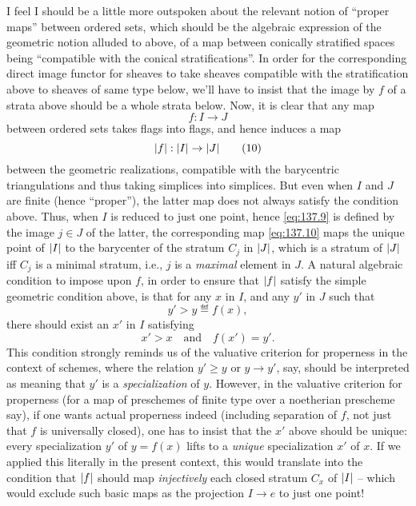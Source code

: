 I feel I should be a little more outspoken about the relevant notion
of ``proper maps'' between ordered sets, which should be the algebraic
expression of the geometric notion alluded to above, of a map between
conically stratified spaces being ``compatible with the conical
stratifications''. In order for the corresponding direct image functor
for sheaves to take sheaves compatible with the stratification above
to sheaves of same type below, we'll have to insist that the image by
$f$ of a strata above should be a whole strata below. Now, it is clear
that any map
\begin{equation}
  \label{eq:137.9}
  f:I\to J\tag{9}
\end{equation}
between ordered sets takes flags into flags, and hence induces a map
\begin{equation}
  \label{eq:137.10}
  \lvert f\rvert:\lvert I\rvert \to \lvert J\rvert\tag{10}
\end{equation}
between the geometric realizations, compatible with the barycentric
triangulations and thus taking simplices into simplices. But even when
$I$ and $J$ are finite (hence ``proper''), the latter map does not
always satisfy the condition above. Thus, when $I$ is reduced to just
one point, hence \eqref{eq:137.9} is defined by the image $j\in J$ of
the latter, the corresponding map \eqref{eq:137.10} maps the unique
point of $\lvert I\rvert$ to the barycenter of the stratum $C_j$ in $\lvert J\rvert$,
which is a stratum of $\lvert J\rvert$ if{f} $C_j$ is a minimal stratum, i.e.,
$j$ is a \emph{maximal} element in $J$. A natural algebraic condition
to impose upon $f$, in order to ensure that $\lvert f\rvert$ satisfy the
simple geometric condition above, is that for any $x$ in $I$, and any
$y'$ in $J$ such that
\[y'>y \eqdef f(x),\]
there should exist an $x'$ in $I$ satisfying
\begin{equation}
  \label{eq:137.11}
  x'>x \quad\text{and}\quad f(x')=y'.\tag{11}
\end{equation}
This condition strongly reminds us of the valuative criterion for
properness in the context of schemes, where the relation $y'\ge y$ or
$y\to y'$, say, should be interpreted as meaning that $y'$ is a
\emph{specialization} of $y$. However, in the valuative criterion for
properness (for a map of preschemes of finite type over a noetherian
prescheme say), if one wants actual properness indeed
(including separation of $f$, not just that $f$ is universally
closed), one has to insist that the $x'$ above should be unique: every
specialization $y'$ of $y=f(x)$ lifts to a \emph{unique}
specialization $x'$ of $x$. If we applied this literally in the
present context, this would translate into the condition that $\lvert f\rvert$
should map \emph{injectively} each closed stratum $C_x$ of $\lvert I\rvert$ --
which would exclude such basic maps as the projection $I\to e$ to just
one point!

